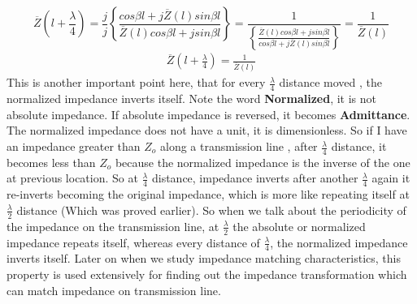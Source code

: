 \begin{dmath*}
\overline{Z}(l+\frac{\lambda}{4}) =\frac{j}{j} \left\lbrace \frac{cos\beta l + j\overline{Z}(l)sin\beta l}{\overline{Z}(l)cos\beta l + jsin\beta l}\right\rbrace = 
\frac{1}{\left\lbrace \frac{\overline{Z}(l)cos\beta l + jsin\beta l}{cos\beta l + j\overline{Z}(l)sin\beta l}\right\rbrace} =\frac{1}{\overline{Z} (l)}
\end{dmath*}
\begin{align*}
\overline{Z}(l+\frac{\lambda}{4}) = \frac{1}{\overline{Z} (l)}
\end{align*}
This is another important point here, that for every $\frac{\lambda}{4}$ distance moved , the normalized impedance inverts itself. Note the word \textbf{Normalized}, it is not absolute impedance. If absolute impedance is reversed, it becomes \textbf{Admittance}. The normalized impedance does not have a unit, it is dimensionless. So if I have an impedance greater than $Z_o$ along a transmission line , after $\frac{\lambda}{4}$ distance, it becomes less than $Z_o$ because the normalized impedance is the inverse of the one at previous location. So at $\frac{\lambda}{4}$ distance, impedance inverts after another $\frac{\lambda}{4}$ again it re-inverts becoming the original impedance, which is more like repeating itself at $\frac{\lambda}{2}$ distance (Which was proved earlier). So when we talk about the periodicity of the impedance on the transmission line, at $\frac{\lambda}{2}$ the absolute or normalized impedance repeats itself, whereas every distance of $\frac{\lambda}{4}$, the normalized impedance inverts itself. Later on when we study impedance matching characteristics, this property is used extensively for finding out the impedance transformation which can match impedance on transmission line.\\
 
